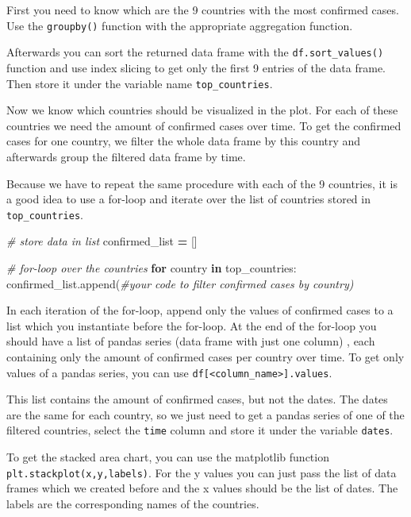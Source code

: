 \documentclass[
  11pt,
]{article}
\newenvironment{Shaded}{\begin{snugshade}}{\end{snugshade}}
\newcommand{\CommentTok}[1]{\textcolor[rgb]{0.56,0.35,0.01}{\textit{#1}}}
\newcommand{\ControlFlowTok}[1]{\textcolor[rgb]{0.13,0.29,0.53}{\textbf{#1}}}
\newcommand{\KeywordTok}[1]{\textcolor[rgb]{0.13,0.29,0.53}{\textbf{#1}}}
\newcommand{\NormalTok}[1]{#1}
\newcommand{\OperatorTok}[1]{\textcolor[rgb]{0.81,0.36,0.00}{\textbf{#1}}}
\newenvironment{tipsp}[1]
  {
  \begin{itemize}
  \footnotesize
  \renewcommand{\labelitemi}{
    \raisebox{-.7\height}[0pt][0pt]{
      {\setkeys{Gin}{width=3em,keepaspectratio}
        \texttt{[image: images/\#1.png]}}
    }
  }
  \setlength{\fboxsep}{1em}
  \begin{pbox}
  \item
  }
  {
  \end{pbox}
  \end{itemize}
  }
\begin{document}
\begin{tipsp}p

First you need to know which are the 9 countries with the most confirmed cases. Use the \texttt{groupby()} function with the appropriate aggregation function.

Afterwards you can sort the returned data frame with the \texttt{df.sort\_values()} function and use index slicing to get only the first 9 entries of the data frame. Then store it under the variable name \texttt{top\_countries}.

Now we know which countries should be visualized in the plot. For each of these countries we need the amount of confirmed cases over time. To get the confirmed cases for one country, we filter the whole data frame by this country and afterwards group the filtered data frame by time.

Because we have to repeat the same procedure with each of the 9 countries, it is a good idea to use a for-loop and iterate over the list of countries stored in \texttt{top\_countries}.

\begin{Shaded}
\begin{Highlighting}[]
\CommentTok{\# store data in list}
\NormalTok{confirmed\_list }\OperatorTok{=}\NormalTok{ []}
 
\CommentTok{\# for{-}loop over the countries}
\ControlFlowTok{for}\NormalTok{ country }\KeywordTok{in}\NormalTok{ top\_countries:}
\NormalTok{    confirmed\_list.append(}\CommentTok{\#your code to filter confirmed cases by country)}
\end{Highlighting}
\end{Shaded}

In each iteration of the for-loop, append only the values of confirmed cases to a list which you instantiate before the for-loop. At the end of the for-loop you should have a list of pandas series (data frame with just one column) , each containing only the amount of confirmed cases per country over time. To get only values of a pandas series, you can use \texttt{df{[}\textless{}column\_name\textgreater{}{]}.values}.

This list contains the amount of confirmed cases, but not the dates. The dates are the same for each country, so we just need to get a pandas series of one of the filtered countries, select the \texttt{time} column and store it under the variable \texttt{dates}.

To get the stacked area chart, you can use the matplotlib function \texttt{plt.stackplot(x,y,labels)}. For the y values you can just pass the list of data frames which we created before and the x values should be the list of dates. The labels are the corresponding names of the countries.

\end{tipsp}
\end{document}
